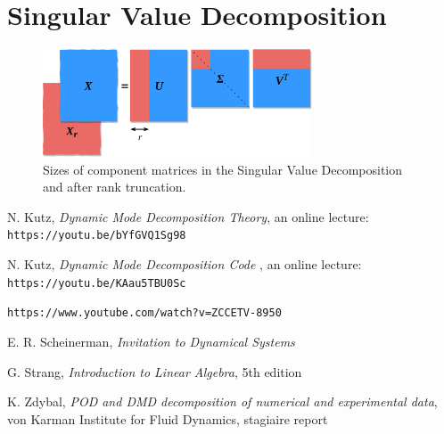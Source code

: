 \documentclass[10pt,twocolumn]{article}
\begin{document}
\section{Singular Value Decomposition} \label{app:C}


\begin{figure}[H]
\centering\includegraphics[width=8cm]{svd.png}
\caption{Sizes of component matrices in the Singular Value Decomposition and after rank truncation.}
\label{fig:linear_system}
\end{figure}


\thebibliography{}

 N. Kutz, \textit{Dynamic Mode Decomposition Theory}, an online lecture: \verb|https://youtu.be/bYfGVQ1Sg98| \label{bib:kutz_1}

 N. Kutz, \textit{Dynamic Mode Decomposition Code }, an online lecture: \verb|https://youtu.be/KAau5TBU0Sc| \label{bib:kutz_2}

 \verb|https://www.youtube.com/watch?v=ZCCETV-8950| \label{bib:andymation}

 E. R. Scheinerman, \textit{Invitation to Dynamical Systems}

 G. Strang, \textit{Introduction to Linear Algebra}, 5th edition

 K. Zdybal, \textit{POD and DMD decomposition of numerical and experimental data}, von Karman Institute for Fluid Dynamics, stagiaire report 
\end{document}
